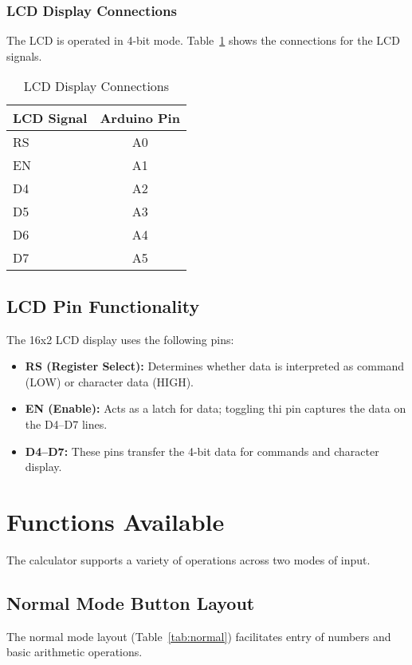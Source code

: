\documentclass[a4paper,12pt]{article}
\begin{document}
\subsubsection{LCD Display Connections}
The LCD is operated in 4-bit mode. Table~\ref{tab:lcd} shows the connections for the LCD signals.

\begin{table}[H]
    \centering
    \renewcommand{\arraystretch}{1.2}
    \begin{tabular}{|l|c|}
        \hline
        \textbf{LCD Signal} & \textbf{Arduino Pin} \\
        \hline
        RS & A0 \\
        EN & A1 \\
        D4 & A2 \\
        D5 & A3 \\
        D6 & A4 \\
        D7 & A5 \\
        \hline
    \end{tabular}
    \caption{LCD Display Connections}
    \label{tab:lcd}
\end{table}

\subsection{LCD Pin Functionality}
The 16x2 LCD display uses the following pins:
\begin{itemize}
    \item \textbf{RS (Register Select):} Determines whether data is interpreted as command (LOW) or character data (HIGH).
    \item \textbf{EN (Enable):} Acts as a latch for data; toggling thi pin captures the data on the D4–D7 lines.
    \item \textbf{D4–D7:} These pins transfer the 4-bit data for commands and character display.
\end{itemize}

\section{Functions Available}
The calculator supports a variety of operations across two modes of input.

\subsection{Normal Mode Button Layout}
The normal mode layout (Table~\ref{tab:normal}) facilitates entry of numbers and basic arithmetic operations.
\end{document}
